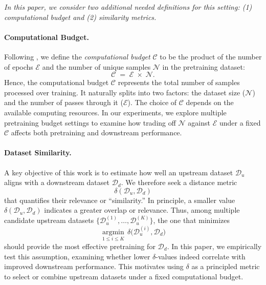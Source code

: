 \textit{In this paper, we consider two additional needed definitions for this setting: (1) computational budget and (2) similarity metrics.}

\paragraph{Computational Budget.} Following \citet{hammoud2024pretraining}, we define the \emph{computational budget} \(\mathcal{C}\) to be the product of the number of epochs \(\mathcal{E}\) and the number of unique samples \(\mathcal{N}\) in the pretraining dataset:
\begin{equation}
\mathcal{C} \;=\; \mathcal{E} \;\times\; \mathcal{N}.
\end{equation}
Hence, the computational budget \(\mathcal{C}\) represents the total number of samples processed over training. It naturally splits into two factors: the dataset size (\(\mathcal{N}\)) and the number of passes through it (\(\mathcal{E}\)). The choice of \(\mathcal{C}\) depends on the available computing resources. In our experiments, we explore multiple pretraining budget settings to examine how trading off \(\mathcal{N}\) against \(\mathcal{E}\) under a fixed \(\mathcal{C}\) affects both pretraining and downstream performance.

\paragraph{Dataset Similarity.} 
A key objective of this work is to estimate how well an upstream dataset \(\mathcal{D}_u\) aligns with a downstream dataset \(\mathcal{D}_d\). We therefore seek a distance metric
\[
\delta(\mathcal{D}_u, \mathcal{D}_d)
\]
that quantifies their relevance or ``similarity.'' In principle, a smaller value \(\delta(\mathcal{D}_u, \mathcal{D}_d)\) indicates a greater overlap or relevance. Thus, among multiple candidate upstream datasets \(\{\mathcal{D}_{u}^{(1)}, \ldots, \mathcal{D}_{u}^{(K)}\}\), the one that minimizes 
\[
\underset{1 \leq i \leq K}{\operatorname{argmin}} \, \delta\bigl(\mathcal{D}_{u}^{(i)}, \mathcal{D}_d\bigr)
\]
should provide the most effective pretraining for \(\mathcal{D}_d\). In this paper, we empirically test this assumption, examining whether lower \(\delta\)-values indeed correlate with improved downstream performance. This motivates using \(\delta\) as a principled metric to select or combine upstream datasets under a fixed computational budget.




